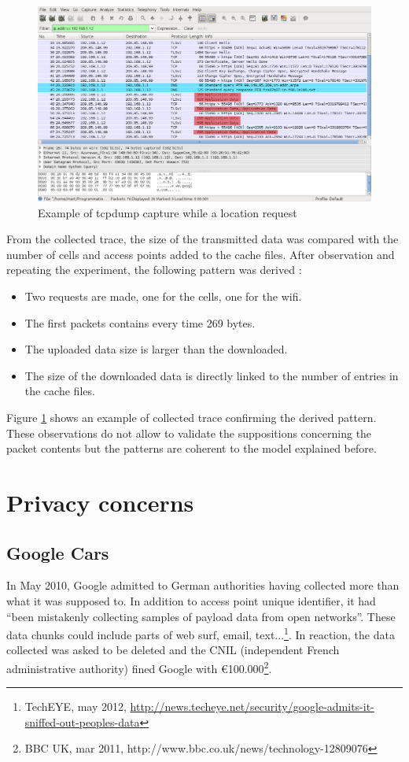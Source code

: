 \begin{figure}[h]
  \hspace*{-2cm}
  \centering
  \includegraphics[width=17cm]{images/trace2.png}
  \caption{Example of tcpdump capture while a location request}
  \label{fig:loc-req-tcpdump}
\end{figure}

From the collected trace, the size of the transmitted data was compared with the number of cells and access points added to the cache files.
After observation and repeating the experiment, the following pattern was derived :

\begin{itemize}
\item Two requests are made, one for the cells, one for the wifi.
\item The first packets contains every time 269 bytes.
\item The uploaded data size is larger than the downloaded.
\item The size of the downloaded data is directly linked to the number of entries in the cache files.
\end{itemize}

Figure \ref{fig:loc-req-tcpdump} shows an example of collected trace confirming the derived pattern.
These observations do not allow to validate the suppositions concerning the packet contents but the patterns are coherent to the model explained before.


\section{Privacy concerns}
\subsection{Google Cars}
In May 2010, Google admitted to German authorities having collected more than what it was supposed to.
In addition to access point unique identifier, it had ``been mistakenly collecting samples of payload data from open networks''.
These data chunks could include parts of web surf, email, text...\footnote{TechEYE, may 2012, \url{http://news.techeye.net/security/google-admits-it-sniffed-out-peoples-data}}.
In reaction, the data collected was asked to be deleted and the CNIL (independent French administrative authority) fined Google with €100.000\footnote{BBC UK, mar 2011, http://www.bbc.co.uk/news/technology-12809076}.\\


